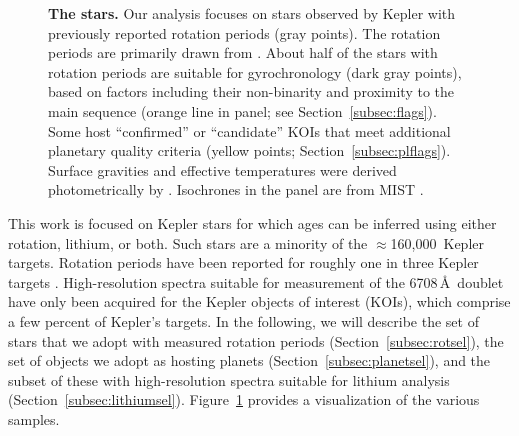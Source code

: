 \documentclass[11pt,twocolumn,tighten]{aastex63}
\newcommand{\nkeplerstars}{$\approx$160{,}000}
\begin{document}
\begin{figure}[!t]
\begin{center}
		\vspace{-0.3cm}
	\end{center}
	\vspace{-0.5cm}
  \caption{{\bf The stars.}  Our analysis focuses on stars observed by
  Kepler with previously reported rotation periods (gray points).  The
  rotation periods are primarily drawn from
  \citet{Santos_2019,Santos_2021}.  About half of the stars with
  rotation periods are suitable for gyrochronology (dark gray points),
  based on factors including their non-binarity and proximity to the
  main sequence (orange line in  panel; see
  Section~\ref{subsec:flags}).  Some host ``confirmed'' or
  ``candidate'' KOIs that meet additional planetary quality criteria
  (yellow points; Section~\ref{subsec:plflags}).  Surface gravities
  and effective temperatures were derived photometrically by
  \citet{Berger_2020a_catalog}.  Isochrones in the  panel are
  from MIST \citep{Choi_2016}.
	}
	\label{fig:stellarprops}
\end{figure}

This work is focused on Kepler stars for which ages can be inferred
using either rotation, lithium, or both.  Such stars are a minority of
the \nkeplerstars\ Kepler targets.  Rotation periods have been
reported for roughly one in three Kepler targets
\citep[e.g.][]{McQuillan_2014,Santos_2021}.  High-resolution spectra
suitable for measurement of the  6708\,\AA\ doublet have
only been acquired for the Kepler objects of interest (KOIs), which
comprise a few percent of Kepler's targets.  In the following, we will
describe the set of stars that we adopt with measured rotation periods
(Section~\ref{subsec:rotsel}), the set of objects we adopt as hosting
planets (Section~\ref{subsec:planetsel}), and the subset of these with
high-resolution spectra suitable for lithium analysis
(Section~\ref{subsec:lithiumsel}).  Figure~\ref{fig:stellarprops}
provides a visualization of the various samples.
\end{document}
